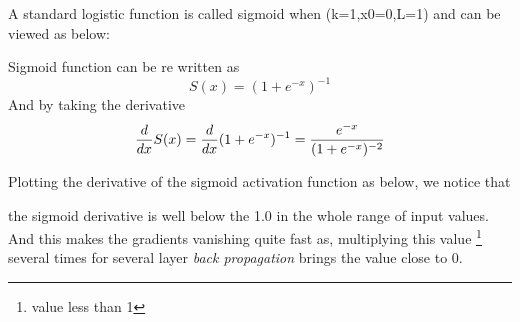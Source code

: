 A standard logistic function is called sigmoid when (k=1,x0=0,L=1) and can be viewed as below: \\

\begin{center}

\end{center}
Sigmoid function can be re written as  \\
\begin{equation}
	S(x) = (1+e^{-x})^{-1}
\end{equation}
And by taking the derivative \\
\begin{equation}
\frac{d}{dx}S(x) = \frac{d}{dx} (1+e^{-x})^{-1} \\
= \frac{e^{-x}} {(1+e^{-x})^{-2}} 
\end{equation}

Plotting the derivative of the sigmoid activation function as below, we notice that 
\begin{center}

\end{center}

the sigmoid derivative is well below the 1.0 in the whole range of input values. And this makes the gradients vanishing quite fast as, multiplying this value \footnote{value less than 1} several times for several layer \textit{ back propagation} brings the value close to 0.



